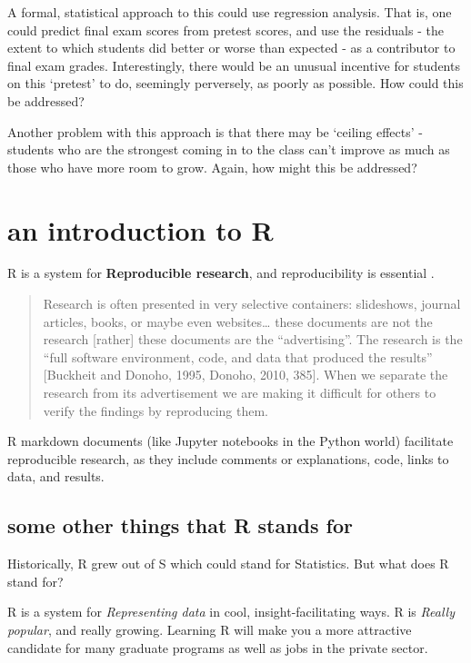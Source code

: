 \documentclass[openany]{book}
\begin{document}
A formal, statistical approach to this could use regression analysis. That is, one could predict final exam scores from pretest scores, and use the residuals - the extent to which students did better or worse than expected - as a contributor to final exam grades. Interestingly, there would be an unusual incentive for students on this `pretest' to do, seemingly perversely, as poorly as possible. How could this be addressed?

Another problem with this approach is that there may be `ceiling effects' - students who are the strongest coming in to the class can't improve as much as those who have more room to grow. Again, how might this be addressed?

\hypertarget{an-introduction-to-r}{%
\chapter{an introduction to R}\label{an-introduction-to-r}}

R is a system for \textbf{Reproducible research}, and reproducibility is essential \citep{gandrud2016reproducible}.

\begin{quote}
Research is often presented in very selective containers: slideshows, journal articles, books, or maybe even websites\ldots{} these documents are not the research {[}rather{]} these documents are the ``advertising''. The research is the ``full software environment, code, and data that produced the results'' {[}Buckheit and Donoho, 1995, Donoho, 2010, 385{]}. When we separate the research from its advertisement we are making it difficult for others to verify the findings by reproducing them.
\end{quote}

R markdown documents (like Jupyter notebooks in the Python world) facilitate reproducible research, as they include comments or explanations, code, links to data, and results.

\hypertarget{some-other-things-that-r-stands-for}{%
\section{some other things that R stands for}\label{some-other-things-that-r-stands-for}}

Historically, R grew out of S which could stand for Statistics. But what does R stand for?

R is a system for \emph{Representing data} in cool, insight-facilitating ways. R is \emph{Really popular}, and really growing. Learning R will make you a more attractive candidate for many graduate programs as well as jobs in the private sector.
\end{document}
